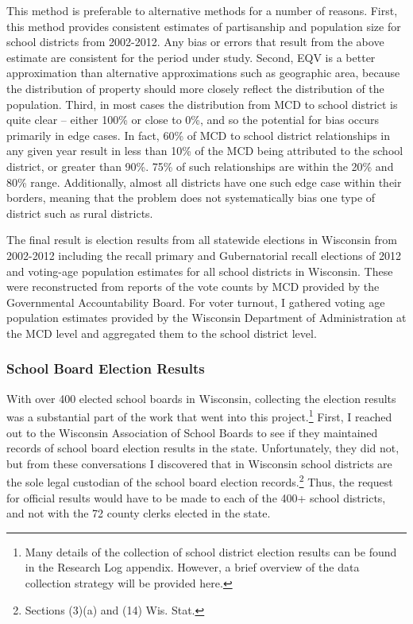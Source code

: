 This method is preferable to alternative methods for a number of reasons. 
First, this method provides consistent estimates of partisanship and population 
size for school districts from 2002-2012. Any bias or errors that result from the 
above estimate are consistent for the period under study. Second, EQV is a better 
approximation than alternative approximations such as geographic area, because 
the distribution of property should more closely reflect the distribution of 
the population. Third, in most cases the distribution from MCD to school district 
is quite clear -- either 100\% or close to 0\%, and so the potential for bias 
occurs primarily in edge cases. In fact, 60\% of MCD to school district relationships 
in any given year result in less than 10\% of the MCD being attributed to the 
school district, or greater than 90\%. 75\% of such relationships are within the 
20\% and 80\% range. Additionally, almost all districts have one such edge case 
within their borders, meaning that the problem does not systematically bias one 
type of district such as rural districts. 

The final result is election results from all statewide elections in Wisconsin 
from 2002-2012 including the recall primary and Gubernatorial recall elections of 
2012 and voting-age population estimates for all school districts in Wisconsin. 
These were reconstructed from reports of the vote counts by MCD provided by the 
Governmental Accountability Board. For voter turnout, I gathered voting age 
population estimates provided by the Wisconsin Department of Administration at 
the MCD level and aggregated them to the school district level. 

\subsubsection{School Board Election Results}

With over 400 elected school boards in Wisconsin, collecting the election results 
was a substantial part of the work that went into this project.\footnote{Many 
details of the collection of school district election results can be found 
in the Research Log appendix. However, a brief overview of the data collection 
strategy will be provided here.} First, I reached out to the Wisconsin Association 
of School Boards to see if they maintained records of school board election results 
in the state. Unfortunately, they did not, but from these conversations I discovered 
that in Wisconsin school districts are the sole legal custodian of the school 
board election records.\footnote{Sections (3)(a) and (14) Wis. Stat.} Thus, the request for official results would have to be made to each of the 400+
school districts, and not with the 72 county clerks elected in the state. 

